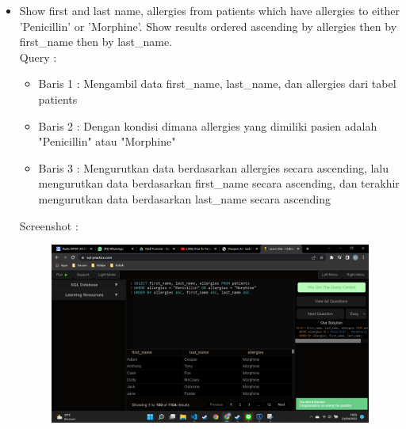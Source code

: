 \documentclass[]{article}
\begin{document}
\begin{itemize}
        \item Show first and last name, allergies from patients which have allergies to either 'Penicillin' or 'Morphine'. Show results ordered ascending by allergies then by first\_name then by last\_name.
        \\Query :
        
        \begin{itemize}
            \item Baris 1 : Mengambil data first\_name, last\_name, dan allergies dari tabel patients
            \item Baris 2 : Dengan kondisi dimana allergies yang dimiliki pasien adalah "Penicillin" atau "Morphine"
            \item Baris 3 : Mengurutkan data berdasarkan allergies secara ascending, lalu mengurutkan data berdasarkan first\_name secara ascending, dan terakhir mengurutkan data berdasarkan last\_name secara ascending
        \end{itemize}
        Screenshot :
        \begin{figure}[h]
            \includegraphics[scale=0.3]{./Screenshot/Medium-7.png}
            \centering
        \end{figure}


\end{itemize}
\end{document}
